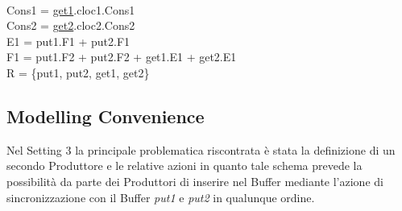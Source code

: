 \documentclass{article}
\begin{document}
\\Cons1 = \underline{get1}.cloc1.Cons1
\\Cons2 = \underline{get2}.cloc2.Cons2
\\E1 = put1.F1 + put2.F1
\\F1 = put1.F2 + put2.F2 + get1.E1 + get2.E1
\\R = \{put1, put2, get1, get2\}
\begin{figure}[h] 
\centering
{}
\end{figure}
\subsection{Modelling Convenience}
Nel Setting 3 la principale problematica riscontrata è stata la definizione di un secondo Produttore e le relative azioni in quanto tale schema prevede la possibilità da parte dei Produttori di inserire nel Buffer mediante l'azione di sincronizzazione con il Buffer \textit{put1} e \textit{put2} in qualunque ordine.
\end{document}
